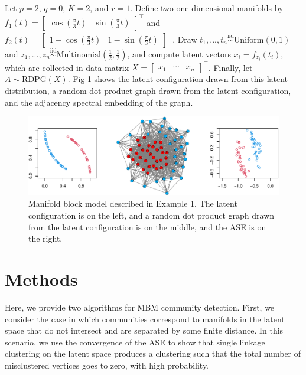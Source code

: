 \documentclass[12pt]{article}
\begin{document}
\begin{example}
Let $p = 2$, $q = 0$, $K = 2$, and $r = 1$. 
Define two one-dimensional manifolds by $f_1(t) = \begin{bmatrix} \cos(\frac{\pi}{3} t) & \sin(\frac{\pi}{3} t) \end{bmatrix}^\top$ and $f_2(t) = \begin{bmatrix} 1 - \cos(\frac{\pi}{3} t) & 1 - \sin(\frac{\pi}{3} t) \end{bmatrix}^\top$.
Draw $t_1, ..., t_n \stackrel{\mathrm{iid}}{\sim}\mathrm{Uniform}(0, 1)$ and $z_1, ..., z_n \stackrel{\mathrm{iid}}{\sim}\mathrm{Multinomial}(\frac{1}{2}, \frac{1}{2})$, and compute latent vectors $x_i = f_{z_i}(t_i)$, which are collected in data matrix $X = \begin{bmatrix} x_1 & \cdots & x_n \end{bmatrix}^\top$. 
Finally, let $A \sim \mathrm{RDPG}(X)$. Fig \ref{fig:example1} shows the latent configuration drawn from this latent distribution, a random dot product graph drawn from the latent configuration, and the adjacency spectral embedding of the graph. 

\begin{figure}[H]

{\centering \includegraphics{draft_files/figure-latex/example1-1} 

}

\caption{Manifold block model described in Example 1. The latent configuration is on the left, and a random dot product graph drawn from the latent configuration is on the middle, and the ASE is on the right.}\label{fig:example1}
\end{figure}
\end{example}

\hypertarget{methods}{%
\section{Methods}\label{methods}}

Here, we provide two algorithms for MBM community detection. First, we
consider the case in which communities correspond to manifolds in the
latent space that do not intersect and are separated by some finite
distance. In this scenario, we use the convergence of the ASE to show
that single linkage clustering on the latent space produces a clustering
such that the total number of misclustered vertices goes to zero, with
high probability.
\end{document}
